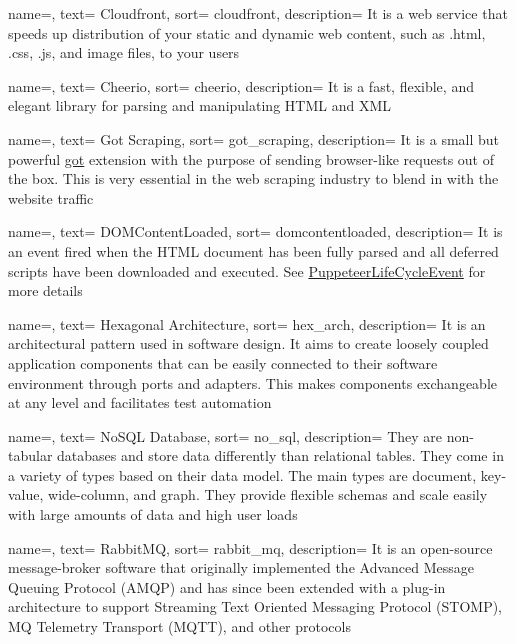 {
  name=,
  text= Cloudfront,
  sort= cloudfront,
  description= {It is a web service that speeds up distribution of your static and dynamic web content, such as .html, .css, .js, and image files, to your users}
}

{
  name=,
  text= Cheerio,
  sort= cheerio,
  description= {It is a fast, flexible, and elegant library for parsing and manipulating HTML and XML}
}

{
  name=,
  text= Got Scraping,
  sort= got_scraping,
  description= {It is a small but powerful \href{https://github.com/sindresorhus/got}{got} extension with the purpose of sending browser-like requests out of the box. This is very essential in the web scraping industry to blend in with the website traffic}
}

{
  name=,
  text= DOMContentLoaded,
  sort= domcontentloaded,
  description= {It is an event fired when the HTML document has been fully parsed and all deferred scripts have been downloaded and executed. See \href{https://pptr.dev/api/puppeteer.puppeteerlifecycleevent}{PuppeteerLifeCycleEvent} for more details}
}

{
  name=,
  text= Hexagonal Architecture,
  sort= hex_arch,
  description= {It is an architectural pattern used in software design. It aims to create loosely coupled application components that can be easily connected to their software environment through ports and adapters. This makes components exchangeable at any level and facilitates test automation}
}

{
  name=,
  text= NoSQL Database,
  sort= no_sql,
  description= {They are non-tabular databases and store data differently than relational tables. They come in a variety of types based on their data model. The main types are document, key-value, wide-column, and graph. They provide flexible schemas and scale easily with large amounts of data and high user loads}
}

{
  name=,
  text= RabbitMQ,
  sort= rabbit_mq,
  description= {It is an open-source message-broker software that originally implemented the Advanced Message Queuing Protocol (AMQP) and has since been extended with a plug-in architecture to support Streaming Text Oriented Messaging Protocol (STOMP), MQ Telemetry Transport (MQTT), and other protocols}
}

